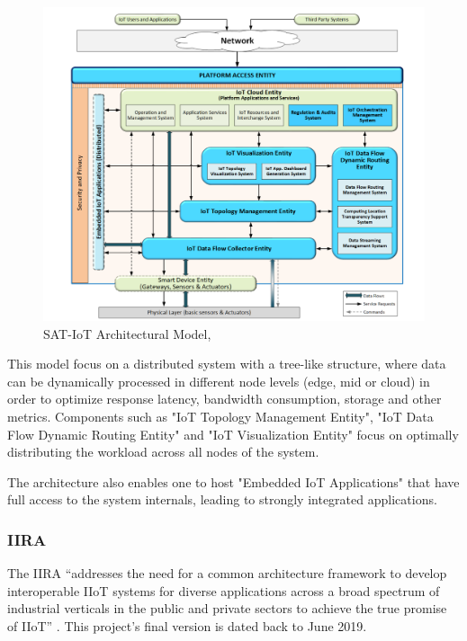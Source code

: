 \begin{figure}[H]
    \centering
    \includegraphics[scale=0.4]{assets/figures/sat-iot.png}
    \caption[SAT-IoT Architectural Model]{SAT-IoT Architectural Model, \cite{8767282}}
    \label{fig:stateofart:arch:sat:model}
\end{figure}

This model focus on a distributed system with a tree-like structure, where data can be dynamically processed in different node levels (edge, mid or cloud) in order to optimize response latency, bandwidth consumption, storage and other metrics. Components such as "IoT Topology Management Entity", "IoT Data Flow Dynamic Routing Entity" and "IoT Visualization Entity" focus on optimally distributing the workload across all nodes of the system.

The architecture also enables one to host "Embedded IoT Applications" that have full access to the system internals, leading to strongly integrated applications.

\subsubsection{IIRA}
\label{subsubsec:stateofart:arch:iira}

The \gls{IIRA} ``addresses the need for a common architecture framework to develop interoperable IIoT systems for diverse applications across a broad spectrum of industrial verticals in the public and private sectors to achieve the true promise of IIoT'' \parencite{iira}. This project's final version is dated back to June 2019.

